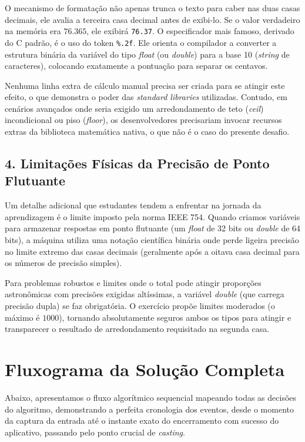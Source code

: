 \documentclass[11pt]{article}
\begin{document}
\begin{successbox}
O mecanismo de formatação não apenas trunca o texto para caber nas duas casas decimais, ele avalia a terceira casa decimal antes de exibi-lo. Se o valor verdadeiro na memória era $76.365$, ele exibirá \texttt{76.37}. O especificador mais famoso, derivado do C padrão, é o uso do token \texttt{\%.2f}. Ele orienta o compilador a converter a estrutura binária da variável do tipo \textit{float} (ou \textit{double}) para a base 10 (\textit{string} de caracteres), colocando exatamente a pontuação para separar os centavos.
\end{successbox}

Nenhuma linha extra de cálculo manual precisa ser criada para se atingir este efeito, o que demonstra o poder das \textit{standard libraries} utilizadas. Contudo, em cenários avançados onde seria exigido um arredondamento de teto (\textit{ceil}) incondicional ou piso (\textit{floor}), os desenvolvedores precisariam invocar recursos extras da biblioteca matemática nativa, o que não é o caso do presente desafio.

\subsection*{4. Limitações Físicas da Precisão de Ponto Flutuante}

Um detalhe adicional que estudantes tendem a enfrentar na jornada da aprendizagem é o limite imposto pela norma IEEE 754. Quando criamos variáveis para armazenar respostas em ponto flutuante (um \textit{float} de 32 bits ou \textit{double} de 64 bits), a máquina utiliza uma notação científica binária onde perde ligeira precisão no limite extremo das casas decimais (geralmente após a oitava casa decimal para os números de precisão simples).

Para problemas robustos e limites onde o total pode atingir proporções astronômicas com precisões exigidas altíssimas, a variável \textit{double} (que carrega precisão dupla) se faz obrigatória. O exercício propõe limites moderados (o máximo é $1000$), tornando absolutamente seguros ambos os tipos para atingir e transparecer o resultado de arredondamento requisitado na segunda casa.

\newpage
\section*{Fluxograma da Solução Completa}

Abaixo, apresentamos o fluxo algorítmico sequencial mapeando todas as decisões do algoritmo, demonstrando a perfeita cronologia dos eventos, desde o momento da captura da entrada até o instante exato do encerramento com sucesso do aplicativo, passando pelo ponto crucial de \textit{casting}.
\end{document}
